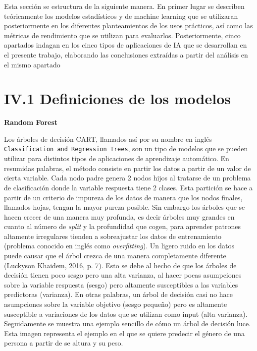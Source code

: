 \documentclass[]{DissertateUSU}
\begin{document}
\noindent Esta sección se estructura de la siguiente manera. En primer
lugar se describen teóricamente los modelos estadísticos y de machine
learning que se utilizaran posteriormente en los diferentes
planteamientos de los usos prácticos, así como las métricas de
rendimiento que se utilizan para evaluarlos. Posteriormente, cinco
apartados indagan en los cinco tipos de aplicaciones de IA que se
desarrollan en el presente trabajo, elaborando las conclusiones
extraídas a partir del análisis en el mismo apartado

\FloatBarrier
{}
\fancyfoot[C]{\thepage}

\section{IV.1 \textbf{Definiciones de los modelos}}

\textbf{Random Forest}

\noindent Los árboles de decisión CART, llamados así por su nombre en
inglés \texttt{Classification\ and\ Regression\ Trees}, son un tipo de
modelos que se pueden utilizar para distintos tipos de aplicaciones de
aprendizaje automático. En resumidas palabras, el método consiste en
partir los datos a partir de un valor de cierta variable. Cada nodo
padre genera 2 nodos hijos al tratarse de un problema de clasificación
donde la variable respuesta tiene 2 clases. Esta partición se hace a
partir de un criterio de impureza de los datos de manera que los nodos
finales, llamados hojas, tengan la mayor pureza posible. Sin embargo los
árboles que se hacen crecer de una manera muy profunda, es decir árboles
muy grandes en cuanto al número de \emph{split} y la profundidad que
cogen, para aprender patrones altamente irregulares tienden a
sobreajustar los datos de entrenamiento (problema conocido en inglés
como \emph{overfitting}). Un ligero ruido en los datos puede causar que
el árbol crezca de una manera completamente diferente (Luckyson Khaidem,
2016, p. 7). Esto se debe al hecho de que los árboles de decisión tienen
poco sesgo pero una alta varianza, al hacer pocas asumpciones sobre la
variable respuesta (sesgo) pero altamente susceptibles a las variables
predictoras (varianza). En otras palabras, un árbol de decisión casi no
hace asumpciones sobre la variable objetivo (sesgo pequeño) pero es
altamente susceptible a variaciones de los datos que se utilizan como
input (alta varianza). Seguidamente se muestra una ejemplo sencillo de
cómo un árbol de decisión luce. Esta imagen representa el ejemplo en el
que se quiere predecir el género de una persona a partir de se altura y
su peso.
\end{document}
